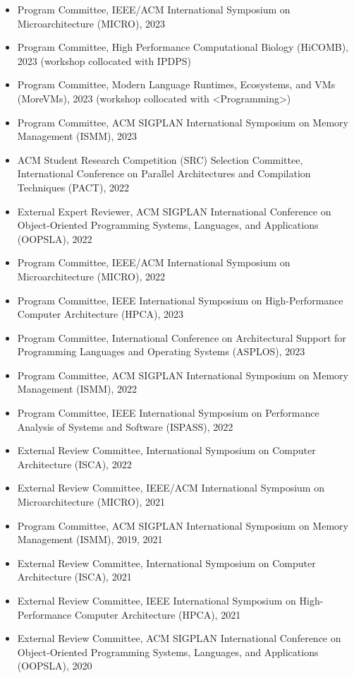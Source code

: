 \documentclass[11pt,a4paper,sans]{moderncv}
\begin{document}
{\begin{itemize}
\item Program Committee, IEEE/ACM International Symposium on Microarchitecture (MICRO), 2023
\item Program Committee, High Performance Computational Biology (HiCOMB), 2023 (workshop collocated with IPDPS)
\item Program Committee, Modern Language Runtimes, Ecosystems, and VMs (MoreVMs), 2023 (workshop collocated with \textless Programming\textgreater) 
\item Program Committee, ACM SIGPLAN International Symposium on Memory Management (ISMM), 2023
\item ACM Student Research Competition (SRC) Selection Committee, International Conference on Parallel Architectures and Compilation Techniques (PACT), 2022
\item External Expert Reviewer, ACM SIGPLAN International Conference on Object-Oriented Programming Systems, Languages, and Applications (OOPSLA), 2022
\item Program Committee, IEEE/ACM International Symposium on Microarchitecture (MICRO), 2022
\item Program Committee, IEEE International Symposium on High-Performance Computer Architecture (HPCA), 2023
\item Program Committee, International Conference on Architectural Support for Programming Languages and Operating Systems (ASPLOS), 2023
\item Program Committee, ACM SIGPLAN International Symposium on Memory Management (ISMM), 2022
\item Program Committee, IEEE International Symposium on Performance Analysis of Systems and Software (ISPASS), 2022
\item External Review Committee, International Symposium on Computer Architecture (ISCA), 2022
\item External Review Committee, IEEE/ACM International Symposium on Microarchitecture (MICRO), 2021
\item Program Committee, ACM SIGPLAN International Symposium on Memory Management (ISMM), 2019, 2021
\item External Review Committee, International Symposium on Computer Architecture (ISCA), 2021
\item External Review Committee, IEEE International Symposium on High-Performance Computer Architecture (HPCA), 2021
\item External Review Committee, ACM SIGPLAN International Conference on Object-Oriented Programming Systems, Languages, and Applications (OOPSLA), 2020

\end{itemize}}
\end{document}
